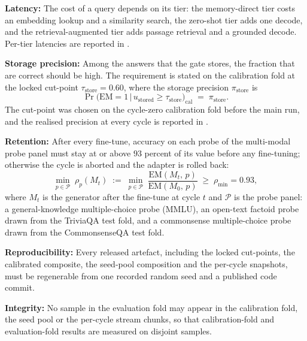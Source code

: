 \textbf{Latency:} The cost of a query depends on its tier: the memory-direct tier costs an embedding lookup and a similarity search, the zero-shot tier adds one decode, and the retrieval-augmented tier adds passage retrieval and a grounded decode. Per-tier latencies are reported in .

\textbf{Storage precision:} Among the answers that the gate stores, the fraction that are correct should be high. The requirement is stated on the calibration fold at the locked cut-point $\tau_{\text{store}} = 0.60$, where the storage precision $\pi_{\text{store}}$ is
\begin{equation}
\Pr\!\big(\mathrm{EM} = 1 \,\big|\, u_{\text{stored}} \ge \tau_{\text{store}}\big)_{\text{cal}} \;=\; \pi_{\text{store}}.
\label{eq:nfr-precision-floor}
\end{equation}
The cut-point was chosen on the cycle-zero calibration fold before the main run, and the realised precision at every cycle is reported in .

\textbf{Retention:} After every fine-tune, accuracy on each probe of the multi-modal probe panel must stay at or above $93$ percent of its value before any fine-tuning; otherwise the cycle is aborted and the adapter is rolled back:
\begin{equation}
\min_{p \in \mathcal{P}}\; \rho_{p}(M_{t}) \;:=\; \min_{p \in \mathcal{P}}\; \frac{\mathrm{EM}(M_{t},\,p)}{\mathrm{EM}(M_{0},\,p)} \;\ge\; \rho_{\min} = 0.93,
\label{eq:nfr-retention-floor}
\end{equation}
where $M_{t}$ is the generator after the fine-tune at cycle $t$ and $\mathcal{P}$ is the probe panel: a general-knowledge multiple-choice probe (MMLU), an open-text factoid probe drawn from the TriviaQA test fold, and a commonsense multiple-choice probe drawn from the CommonsenseQA test fold.

\textbf{Reproducibility:} Every released artefact, including the locked cut-points, the calibrated composite, the seed-pool composition and the per-cycle snapshots, must be regenerable from one recorded random seed and a published code commit.

\textbf{Integrity:} No sample in the evaluation fold may appear in the calibration fold, the seed pool or the per-cycle stream chunks, so that calibration-fold and evaluation-fold results are measured on disjoint samples.

